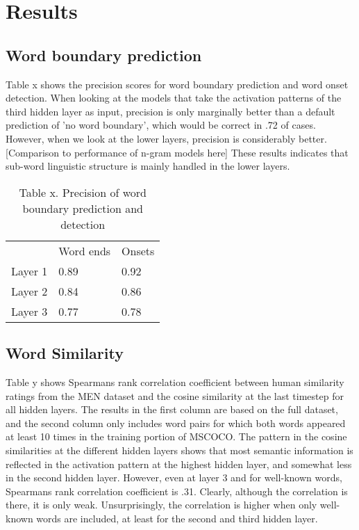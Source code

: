 \section{Results}
\label{sec:results}

\subsection{Word boundary prediction}
Table x shows the precision scores for word boundary prediction and word onset detection. When looking at the models that take the activation patterns of the third hidden layer as input, precision is only marginally better than a default prediction of 'no word boundary', which would be correct in .72 of cases. %
However, when we look at the lower layers, precision is considerably better. [Comparison to performance of n-gram models here]
These results indicates that sub-word linguistic structure is mainly handled in the lower layers.

\begin{table}[]
	\centering
	\caption{Table x. Precision of word boundary prediction and detection}
	\begin{tabular}{lll}
		& Word ends      & Onsets         \\
		Layer 1 & 0.89   & 0.92 \\
		Layer 2 & 0.84  & 0.86 \\
		Layer 3 & 0.77 & 0.78
	\end{tabular}
\end{table}

\subsection{Word Similarity} %
Table y shows Spearmans rank correlation coefficient between human similarity ratings from the MEN dataset and the cosine similarity at the last timestep for all hidden layers. The results in the first column are based on the full dataset, and the second column only includes word pairs for which both words appeared at least 10 times in the training portion of MSCOCO. %
The pattern in the cosine similarities at the different hidden layers shows that most semantic information is reflected in the activation pattern at the highest hidden layer, and somewhat less in the second hidden layer. However, even at layer 3 and for well-known words, Spearmans rank correlation coefficient is .31. Clearly, although the correlation is there, it is only weak.  %
Unsurprisingly, the correlation is higher when only well-known words are included, at least for the second and third hidden layer. %


